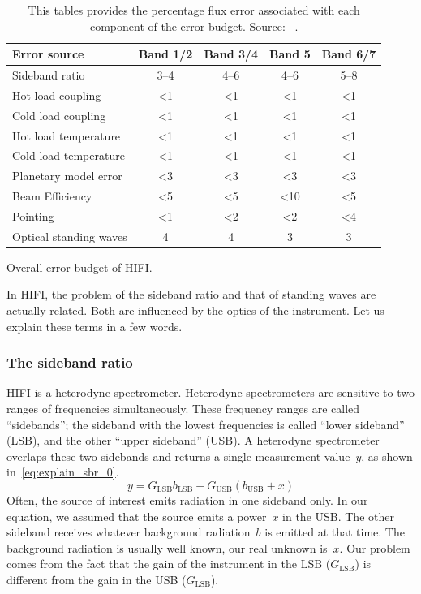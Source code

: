\begin{table}[hbtp]
    \centering
    \begin{tabular}{lcccc}
        \toprule
        Error source           & Band 1/2 & Band 3/4 & Band 5 & Band 6/7 \\
        \midrule
        Sideband ratio         & 3--4     & 4--6     & 4--6   & 5--8     \\
        Hot load coupling      & <1       & <1       & <1     & <1       \\
        Cold load coupling     & <1       & <1       & <1     & <1       \\
        Hot load temperature   & <1       & <1       & <1     & <1       \\
        Cold load temperature  & <1       & <1       & <1     & <1       \\
        Planetary model error  & <3       & <3       & <3     & <3       \\
        Beam Efficiency        & <5       & <5       & <10    & <5       \\
        Pointing               & <1       & <2       & <2     & <4       \\
        Optical standing waves &  4       & 4        & 3      & 3        \\
        \bottomrule
    \end{tabular}
    \caption{Overall error budget of HIFI.}
    \caption*{
        This tables provides the percentage flux error associated with each component of the error budget.
        Source: ~\cite{hifiobserversmanual}.
    }
    \label{tab:calibration_errors}
\end{table}

In HIFI, the problem of the sideband ratio and that of standing waves are actually related.
Both are influenced by the optics of the instrument.
Let us explain these terms in a few words.

\subsubsection{The sideband ratio}
HIFI is a heterodyne spectrometer.
Heterodyne spectrometers are sensitive to two ranges of frequencies simultaneously.
These frequency ranges are called ``sidebands''; the sideband with the lowest frequencies is called ``lower sideband'' (LSB), and the other ``upper sideband'' (USB).
A heterodyne spectrometer overlaps these two sidebands and returns a single measurement value~$y$, as shown in~\cref{eq:explain_sbr_0}.
\begin{equation}
    y = G_\text{LSB} b_\text{LSB} + G_\text{USB} (b_\text{USB} + x)
    \label{eq:explain_sbr_0}
\end{equation}
Often, the source of interest emits radiation in one sideband only.
In our equation, we assumed that the source emits a power~$x$ in the USB.
The other sideband receives whatever background radiation~$b$ is emitted at that time.
The background radiation is usually well known, our real unknown is~$x$.
Our problem comes from the fact that the gain of the instrument in the LSB ($G_\text{LSB}$) is different from the gain in the USB ($G_\text{LSB}$).

